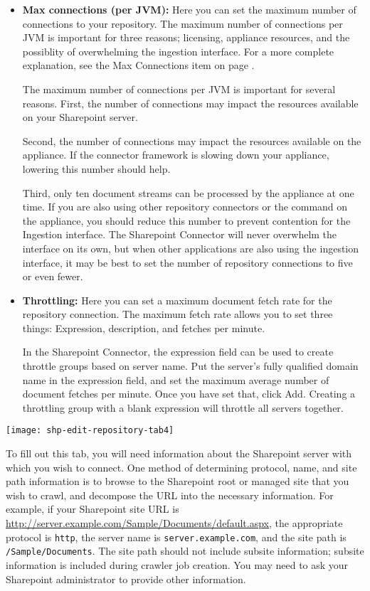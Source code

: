 \begin{itemize}

\item \textbf{Max connections (per JVM):} Here you can set the maximum
number of connections to your repository.  \ifCombinedConnectorGuide
The maximum number of connections per JVM is important for three
reasons; licensing, appliance resources, and the possiblity of
overwhelming the ingestion interface. For a more complete explanation,
see the Max Connections item on page \pageref{maxrepocon}.\fi

\ifJDBCGuide
The maximum number of connections per JVM is important for several
reasons.  First, the number of connections may impact the resources
available on your Sharepoint server.

Second, the number of connections may impact the resources
available on the appliance. If the connector framework is slowing down
your appliance, lowering this number should help.

Third, only ten document streams can be processed by the appliance
at one time.  If you are also using other repository connectors or
the  command on the appliance, you should reduce this
number to prevent contention for the Ingestion interface. The Sharepoint
Connector will never overwhelm the interface on its own, but when other
applications are also using the ingestion interface, it may be best to
set the number of repository connections to five or even fewer.
\fi


\item \textbf{Throttling:} Here you can set a maximum document fetch
rate for the repository connection.  The maximum fetch rate allows you
to set three things: Expression, description, and fetches per minute.

In the Sharepoint Connector, the expression field can be used to
create throttle groups based on server name. Put the server's fully
qualified domain name in the expression field, and set the maximum
average number of document fetches per minute. Once you have set that,
click Add. Creating a throttling group with a blank expression will
throttle all servers together.

\end{itemize}

\texttt{[image: shp-edit-repository-tab4]}

To fill out this tab, you will need information about the Sharepoint
server with which you wish to connect. One method of determining
protocol, name, and site path information is to browse to the
Sharepoint root or managed site that you wish to crawl, and decompose
the URL into the necessary information. For example, if your
Sharepoint site URL is
\url{http://server.example.com/Sample/Documents/default.aspx}, the
appropriate protocol is \texttt{http}, the server name is
\texttt{server.example.com}, and the site path is
\texttt{/Sample/Documents}. The site path should not include subsite information; subsite information is included during crawler job creation. You may need
to ask your Sharepoint administrator to provide other information.

